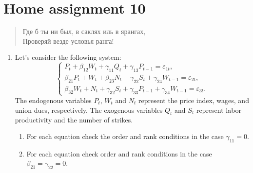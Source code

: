 \documentclass[12pt]{article}
\begin{document}
\newpage
{}
\section*{Home assignment 10}

\begin{verse}
    \begin{flushright}
        Где б ты ни был, в саклях иль в ярангах, \\
        Проверяй везде условья ранга!
        \end{flushright}
\end{verse}

\begin{enumerate}

\item Let's consider the following system:
\[
\begin{cases} 
    P_t + \beta_{12} W_t + \gamma_{11} Q_t + \gamma_{13} P_{t-1} = \varepsilon_{1t}, \\ 
    \beta_{21} P_t + W_t + \beta_{23} N_t + \gamma_{22} S_t + \gamma_{24} W_{t-1} = \varepsilon_{2t}, \\ 
    \beta_{32} W_t + N_t + \gamma_{32} S_t + \gamma_{33} P_{t-1} + \gamma_{34} W_{t-1} = \varepsilon_{3t}.
\end{cases}
\]
The endogenous variables $P_t$, $W_t$ and $N_t$ represent the price index, wages, and union dues, respectively.
The exogenous variables $Q_t$ and $S_t$ represent labor productivity and the number of strikes. 
\begin{enumerate}
    \item For each equation check the order and rank conditions in the case $\gamma_{11} = 0$.
    \item For each equation check order and rank conditions in the case $\beta_{21} = \gamma_{22} = 0$.
\end{enumerate}



\end{enumerate}
\end{document}
